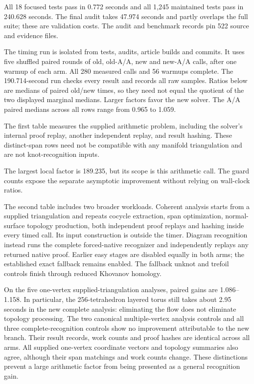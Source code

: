 All 18 focused tests pass in 0.772 seconds and all 1,245 maintained tests pass
in 240.628 seconds. The final audit takes 47.974 seconds and partly overlaps
the full suite; these are validation costs. The audit and benchmark records
pin 522 source and evidence files.

The timing run is isolated from tests, audits, article builds and commits.
It uses five shuffled paired rounds of old, old-A/A, new and new-A/A calls,
after one warmup of each arm. All 280 measured calls and 56 warmups complete.
The 190.714-second run checks every result and records all raw samples.
Ratios below are medians of paired old/new times, so they need not equal
the quotient of the two displayed marginal medians. Larger factors favor
the new solver. The A/A paired medians across all rows range from 0.965 to
1.059.

The first table measures the supplied arithmetic problem, including the
solver's internal proof replay, another independent replay, and result
hashing. These distinct-span rows need not be compatible with any manifold
triangulation and are not knot-recognition inputs.

The largest local factor is 189.235, but its scope is this arithmetic call.
The guard counts expose the separate asymptotic improvement without relying
on wall-clock ratios.

The second table includes two broader workloads. Coherent analysis starts
from a supplied triangulation and repeats cocycle extraction, span
optimization, normal-surface topology production, both independent proof
replays and hashing inside every timed call. Its input construction is
outside the timer. Diagram recognition instead runs the complete forced-native
recognizer and independently replays any returned native proof. Earlier easy
stages are disabled equally in both arms; the established exact fallback
remains enabled. The fallback unknot and trefoil controls finish through
reduced Khovanov homology.


On the five one-vertex supplied-triangulation analyses, paired gains are
1.086--1.158. In particular, the 256-tetrahedron layered torus still takes
about 2.95 seconds in the new complete analysis: eliminating the flow does
not eliminate topology processing. The two canonical multiple-vertex
analysis controls and all three complete-recognition controls show no
improvement attributable to the new branch. Their result records, work
counts and proof hashes are identical across all arms. All supplied
one-vertex coordinate vectors and topology summaries also agree, although
their span matchings and work counts change. These distinctions prevent a
large arithmetic factor from being presented as a general recognition gain.
